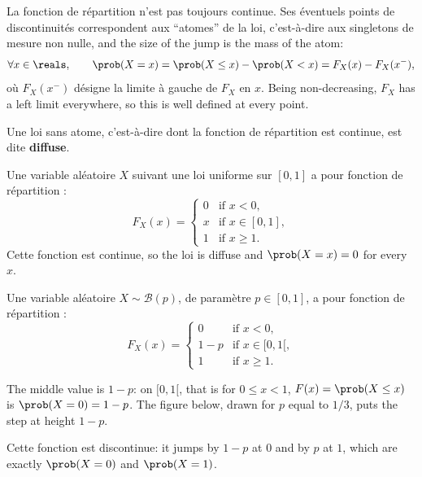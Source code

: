La fonction de répartition n'est pas toujours continue. Ses éventuels points de
discontinuités correspondent aux ``atomes'' de la loi, c'est-à-dire aux singletons
de mesure non nulle, and the size of the jump is the mass of the atom:
\[
  \forall x \in \reals, \qquad
  \prob(X = x) = \prob(X \leq x) - \prob(X < x) = F_{X}(x) - F_{X}(x^{-}),
\]
où $F_{X}(x^{-})$ désigne la limite à gauche de $F_{X}$ en $x$. Being
non-decreasing, $F_{X}$ has a left limit everywhere, so this is well defined at
every point.

\begin{definition}
  Une loi sans atome, c'est-à-dire dont la fonction de répartition est continue,
  est dite \textbf{diffuse}.
\end{definition}

\begin{example}
  Une variable aléatoire $X$ suivant une loi uniforme sur $[0,1]$ a pour fonction
  de répartition :
  \[
    F_{X}(x) =
    \begin{cases}
      0 & \text{if } x < 0,\\
      x & \text{if } x \in [0,1],\\
      1 & \text{if } x \geq 1.
    \end{cases}
  \]
  Cette fonction est continue, so the loi is diffuse and $\prob(X=x)=0$ for every
  $x$.
\end{example}

\begin{example}
  Une variable aléatoire $X \sim \mathcal{B}(p)$, de paramètre $p \in [0,1]$, a
  pour fonction de répartition :
  \[
    F_{X}(x) =
    \begin{cases}
      0 & \text{if } x < 0,\\
      1-p & \text{if } x \in [0,1[,\\
      1 & \text{if } x \geq 1 .
    \end{cases}
  \]

  \begin{remark}
    The middle value is $1-p$: on $[0,1[$, that is for
    $0 \leq x < 1$, $F(x) = \prob(X \leq x)$ is $\prob(X = 0) = 1-p$. The figure
    below, drawn for $p$ equal to $1/3$, puts the step at height $1-p$.
  \end{remark}
  Cette fonction est discontinue: it jumps by $1-p$ at $0$ and by $p$ at $1$,
  which are exactly $\prob(X=0)$ and $\prob(X=1)$.
\end{example}

